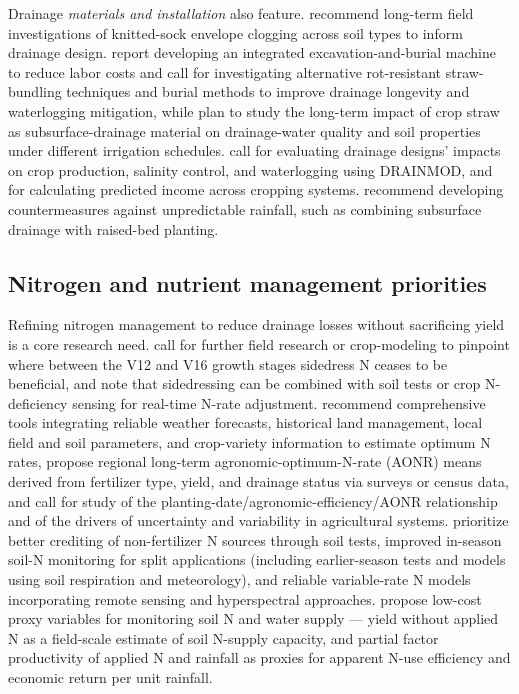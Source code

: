 \documentclass[11pt]{article}
\begin{document}
Drainage \emph{materials and installation} also feature. \textcite{Ghane2022} recommend long-term field investigations of knitted-sock envelope clogging across soil types to inform drainage design. \textcite{Qi2025b} report developing an integrated excavation-and-burial machine to reduce labor costs and call for investigating alternative rot-resistant straw-bundling techniques and burial methods to improve drainage longevity and waterlogging mitigation, while \textcite{Lu2018} plan to study the long-term impact of crop straw as subsurface-drainage material on drainage-water quality and soil properties under different irrigation schedules. \textcite{Ellafi2021} call for evaluating drainage designs' impacts on crop production, salinity control, and waterlogging using DRAINMOD, and for calculating predicted income across cropping systems. \textcite{Takeshima2023} recommend developing countermeasures against unpredictable rainfall, such as combining subsurface drainage with raised-bed planting.

\subsection{Nitrogen and nutrient management priorities}

Refining nitrogen management to reduce drainage losses without sacrificing yield is a core research need. \textcite{Jaynes2013} call for further field research or crop-modeling to pinpoint where between the V12 and V16 growth stages sidedress N ceases to be beneficial, and \textcite{Jaynes2015} note that sidedressing can be combined with soil tests or crop N-deficiency sensing for real-time N-rate adjustment. \textcite{Maas2022} recommend comprehensive tools integrating reliable weather forecasts, historical land management, local field and soil parameters, and crop-variety information to estimate optimum N rates, propose regional long-term agronomic-optimum-N-rate (AONR) means derived from fertilizer type, yield, and drainage status via surveys or census data, and call for study of the planting-date/agronomic-efficiency/AONR relationship and of the drivers of uncertainty and variability in agricultural systems. \textcite{Dinnes2002} prioritize better crediting of non-fertilizer N sources through soil tests, improved in-season soil-N monitoring for split applications (including earlier-season tests and models using soil respiration and meteorology), and reliable variable-rate N models incorporating remote sensing and hyperspectral approaches. \textcite{Cassman2025} propose low-cost proxy variables for monitoring soil N and water supply --- yield without applied N as a field-scale estimate of soil N-supply capacity, and partial factor productivity of applied N and rainfall as proxies for apparent N-use efficiency and economic return per unit rainfall.
\end{document}
